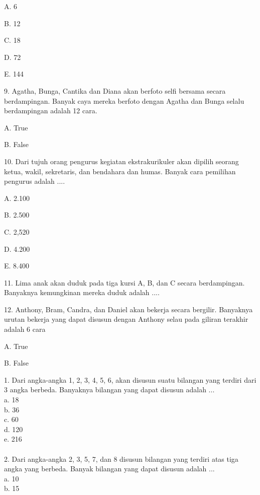 \documentclass[11pt,fleqn]{book} %
\begin{document}
A. 
6

B. 
12

C. 
18

D. 
72

E. 
144

9. 
Agatha, Bunga, Cantika dan Diana akan berfoto selfi bersama secara berdampingan. Banyak caya mereka berfoto dengan Agatha dan Bunga selalu berdampingan adalah 12 cara.

A. 
True

B. 
False

10. 
Dari tujuh orang pengurus kegiatan ekstrakurikuler akan dipilih seorang ketua, wakil, sekretaris, dan bendahara dan humas. Banyak cara pemilihan pengurus adalah ....

A. 
2.100

B. 
2.500

C. 
2,520

D. 
4.200

E. 
8.400

11. 
Lima anak akan duduk pada tiga kursi A, B, dan C secara berdampingan. Banyaknya kemungkinan mereka duduk adalah 
....

12. 
Anthony, Bram, Candra, dan Daniel akan bekerja secara bergilir. Banyaknya urutan bekerja yang dapat disusun dengan Anthony selau pada giliran terakhir adalah 6 cara

A. 
True

B. 
False

 1. Dari angka-angka 1, 2, 3, 4, 5, 6, akan disusun suatu bilangan yang terdiri dari 3 angka berbeda. Banyaknya bilangan yang dapat disusun adalah ...\\ 

a.	18\\

b.	36\\

c.	60\\

d.	120\\

e.	216\\
\\

2. Dari angka-angka 2, 3, 5, 7, dan 8 disusun bilangan yang terdiri atas tiga angka yang berbeda. Banyak bilangan yang dapat disusun adalah ...\\

a.	10\\

b.	15\\
\end{document}

